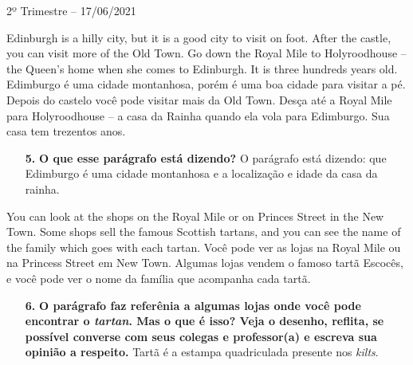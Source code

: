 \documentclass{SchoolBook}
\begin{document}
\begin{day}{2º Trimestre -- 17/06/2021}
        \begin{multicols}{2}
            Edinburgh is a hilly city, but it is a good city to visit on foot. After the castle, you can visit more of the Old Town. Go down the Royal Mile to Holyroodhouse -- the Queen's home when she comes to Edinburgh. It is three hundreds years old.
            \vfill\columnbreak
            Edimburgo é uma cidade montanhosa, porém é uma boa cidade para visitar a pé. Depois do castelo você pode visitar mais da Old Town. Desça até a Royal Mile para Holyroodhouse -- a casa da Rainha quando ela vola para Edimburgo. Sua casa tem trezentos anos.
        \end{multicols}
        
        \begin{enumerate}
            \item[\bf 5.]\textbf{O que esse parágrafo está dizendo?}
            \response O parágrafo está dizendo: que Edimburgo é uma cidade montanhosa e a localização e idade da casa da rainha.
        \end{enumerate}
        
        \begin{multicols}{2}
            You can look at the shops on the Royal Mile or on Princes Street in the New Town. Some shops sell the famous Scottish tartans, and you can see the name of the family which goes with each tartan.
            \vfill\columnbreak
            Você pode ver as lojas na Royal Mile ou na Princess Street em New Town. Algumas lojas vendem o famoso tartã Escocês, e você pode ver o nome da família que acompanha cada tartã.
        \end{multicols}
        
        \begin{enumerate}
            \item[\bf 6.]\textbf{O parágrafo faz referênia a algumas lojas onde você pode encontrar o \emph{tartan}. Mas o que é isso? Veja o desenho, reflita, se possível converse com seus colegas e professor(a) e escreva sua opinião a respeito.}
            \response Tartã é a estampa quadriculada presente nos \emph{kilts}.
        \end{enumerate}
    \end{day}
    
\end{document}

